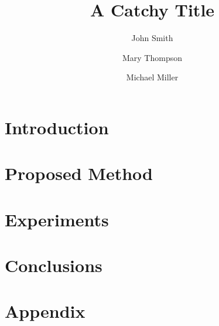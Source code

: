\documentclass[sigconf, nonacm]{acmart}
\begin{document}
\newcommand{\beq}{\begin{equation}}
	\newcommand{\eeq}{\end{equation}}
\newcommand{\bit}{\begin{itemize*}}
	\newcommand{\eit}{\end{itemize*}}
\newcommand{\goal}[1]{ {\noindent {$\Rightarrow$} \em {#1} } }
\newcommand{\hide}[1]{}


\title{A Catchy Title}


\author{John Smith}

\author{Mary Thompson}

\author{Michael Miller}
    
\begin{abstract}
	
\end{abstract}
\maketitle

\section{Introduction}
\label{sec:intro}


%

\section{Proposed Method}
\label{sec:proposed}



\section{Experiments}
\label{sec:experiments}


\section{Conclusions}
\label{sec:conclusions}






\newpage
\appendix
\section{Appendix}

\end{document}
